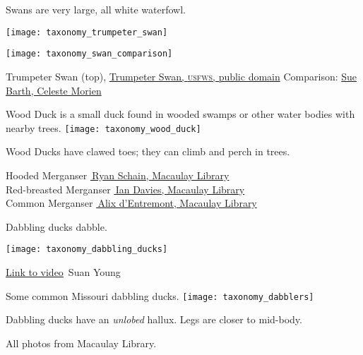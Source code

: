 \documentclass[t]{beamer}
\begin{document}
\begin{frame}{Swans are very large, all white waterfowl.}

\vspace{-0.5\baselineskip}
\texttt{[image: taxonomy\_trumpeter\_swan]}

\texttt{[image: taxonomy\_swan\_comparison]}

\vfilll

\tiny Trumpeter Swan (top), \href{https://www.fws.gov/species/trumpeter-swan-cygnus-buccinator}{Trumpeter Swan, \textsc{usfws,} public domain} 
\hfill Comparison: \href{https://finwr.org/which-swan-is-which/}{Sue Barth, Celeste Morien}

\end{frame}

\begin{frame}{Wood Duck is a small duck found in wooded swamps or other water bodies with nearby trees.}
\texttt{[image: taxonomy\_wood\_duck]}

Wood Ducks have clawed toes; they can climb and perch in trees.
\end{frame}

{
\begin{frame}



\vfilll

\tiny \hfill
Hooded Merganser \href{https://macaulaylibrary.org/asset/36549821}{\textcopyright\,Ryan Schain, Macaulay Library}\\ \hfill
Red-breasted Merganser \href{https://macaulaylibrary.org/asset/23444211}{\textcopyright\,Ian Davies, Macaulay Library} \\ \hfill
Common Merganser \href{https://macaulaylibrary.org/asset/51564761}{\textcopyright\,Alix d'Entremont, Macaulay Library}
\end{frame}
}


\begin{frame}[t]{Dabbling ducks dabble.}
\vspace{-0.5\baselineskip}

\centering
\texttt{[image: taxonomy\_dabbling\_ducks]}


\vfilll
\tiny \href{https://www.youtube.com/watch?v=UaW66BVuZgM}{Link to video} \hfill \textcopyright\,Suan Young
\end{frame}


\begin{frame}{Some common Missouri dabbling ducks.}
\texttt{[image: taxonomy\_dabblers]}

Dabbling ducks have an \textit{unlobed} hallux. Legs are closer to mid-body.

\vfilll

\tinyfill All photos from Macaulay Library.
\end{frame}
\end{document}
